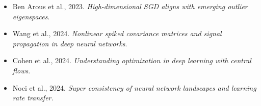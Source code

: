 \begin{frame}
{\begin{itemize}
    \item Ben Arous et al., 2023. \textit{High-dimensional SGD aligns with emerging outlier eigenspaces}. 
    \item Wang et al., 2024. \textit{Nonlinear spiked covariance matrices and signal propagation in deep neural networks}. 
    \item Cohen et al., 2024. \textit{Understanding optimization in deep learning with central flows}.
    \item Noci et al., 2024. 
    \textit{Super consistency of neural network landscapes and learning rate transfer.}
\end{itemize}

}
\end{frame}